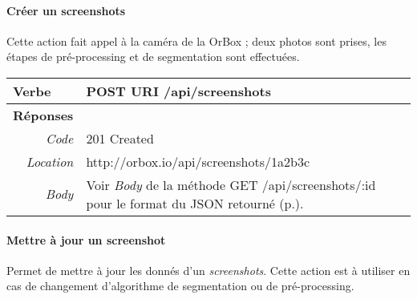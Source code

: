 \begin{appendices}
\begin{absolutelynopagebreak}
\paragraph{Créer un screenshots}
Cette action fait appel à la caméra de la OrBox ; deux photos sont prises, les étapes de pré-processing et de segmentation sont effectuées.

\begin{tabular}{@{}p{2cm}p{11.5cm}@{}}
    \toprule
    \textbf{Verbe}                        & POST \hspace{2.5cm} \textbf{URI} \hspace{0.25cm} /api/screenshots   \\ \midrule
    \textbf{Réponses}                     &        \\
    \multicolumn{1}{r}{\textit{Code}}   & 201 Created \\
    \multicolumn{1}{r}{\textit{Location}}   & http://orbox.io/api/screenshots/1a2b3c \\\multicolumn{1}{r}{\textit{Body}}   & Voir \emph{Body} de la méthode GET /api/screenshots/:id pour le format du JSON retourné (p.\pageref{jsonHalScreenshots}). \\ \bottomrule
\end{tabular}
\end{absolutelynopagebreak}

\begin{absolutelynopagebreak}
\paragraph{Mettre à jour un screenshot}

Permet de mettre à jour les donnés d'un \emph{screenshots}.
Cette action est à utiliser en cas de changement d'algorithme de segmentation ou de pré-processing.


\end{absolutelynopagebreak}
\end{appendices}
